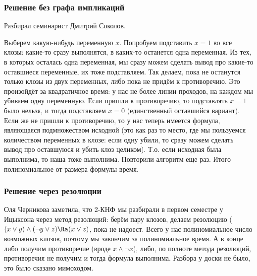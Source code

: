 \subsubsection{Решение без графа импликаций}
	Разбирал семинарист Дмитрий Соколов.

	Выберем какую-нибудь переменную $x$.
	Попробуем подставить $x=1$ во все клозы: какие-то сразу выполнятся,
	в каких-то останется одна переменная.
	Из тех, в которых осталась одна переменная, мы сразу можем сделать вывод про какие-то оставшиеся переменные,
	их тоже подставляем.
	Так делаем, пока не останутся только клозы из двух переменных, либо пока не придём
	к противоречию.
	Это произойдёт за квадратичное время: у нас не более линии проходов, на каждом мы убиваем одну переменную.
	Если пришли к противоречию, то подставлять $x=1$ было нельзя, и тогда подставляем $x=0$ (единственный оставшийся вариант).
	Если же не пришли к противоречию, то у нас теперь имеется формула, являющаяся подмножеством исходной
	(это как раз то место, где мы пользуемся количеством переменных в клозе: если одну убили, то сразу можем
	сделать вывод про оставшуюся и убить клоз целиком).
	Т.о. если исходная была выполнима, то наша тоже выполнима.
	Повторили алгоритм еще раз.
	Итого полиномиальное от размера формулы время.

\subsubsection{Решение через резолюции}
	Оля Черникова заметила, что 2-КНФ мы разбирали в первом семестре у Ицыксона через метод резолюций:
	берём пару клозов, делаем резолюцию ($(x \lor y) \land (\lnot y \lor z) \Ra (x \lor z)$, пока не надоест.
	Всего у нас полиномиальное число возможных клозов, поэтому мы закончим за полиномиальное время.
	А в конце либо получим противоречие (вроде $x \land \lnot x$), либо, по полноте метода резолюций,
	противоречия не получим и тогда формула выполнима.
	Разбора у доски не было, это было сказано мимоходом.
